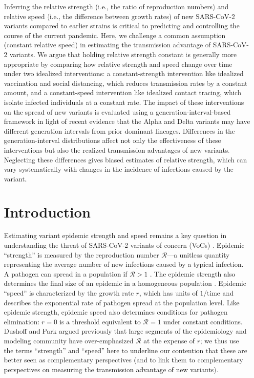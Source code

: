 \documentclass[12pt]{article}
\newcommand{\RR}{\ensuremath{{\mathcal R}}\xspace}
\begin{document}
Inferring the relative strength (i.e., the ratio of reproduction numbers) and relative speed (i.e., the difference between growth rates) of new SARS-CoV-2 variants compared to earlier strains is critical to predicting and controlling the course of the current pandemic.
Here, we challenge a common assumption (constant relative speed) in estimating the transmission advantage of SARS-CoV-2 variants.
We argue that holding relative strength constant is generally more appropriate by comparing how relative strength and speed change over time under two idealized interventions:
a constant-strength intervention like idealized vaccination and social distancing, which reduces transmission rates by a constant amount, and a constant-speed intervention like idealized contact tracing, which isolate infected individuals at a constant rate.
The impact of these interventions on the spread of new variants is evaluated using a generation-interval-based framework in light of recent evidence that the Alpha and Delta variants may have different generation intervals from prior dominant lineages.
Differences in the generation-interval distributions affect not only the effectiveness of these interventions but also the realized transmission advantages of new variants.
Neglecting these differences gives biased estimates of relative strength, which can vary systematically with changes in the incidence of infections caused by the variant.

\section{Introduction}

Estimating variant epidemic strength and speed remains a key question in understanding the threat of SARS-CoV-2 variants of concern (VoCs) \cite{switzerland2021variant,davies2021estimated,di2021impact,graham2021changes,leung2021early,volz2021transmission,zhao2021,campbell2021increased}.
Epidemic ``strength'' is measured by the reproduction number $\RR$---a unitless quantity representing the average number of new infections caused by a typical infection. 
A pathogen can spread in a population if $\RR>1$ \citep{diekmann1990definition}.
The epidemic strength also determines the final size of an epidemic in a homogeneous population \citep{anderson1991infectious}.
Epidemic ``speed'' is characterized by the growth rate $r$, which has units of $1/\mathrm{time}$ and describes the exponential rate of pathogen spread at the population level.
Like epidemic strength, epidemic speed also determines conditions for pathogen elimination: $r=0$ is a threshold equivalent to $\RR=1$ under constant conditions.
Dushoff and Park \citep{doi:10.1098/rspb.2020.1556} argued previously that large segments of the epidemiology and modeling community have over-emphasized $\RR$ at the expense of $r$; 
we thus use the terms ``strength'' and ``speed''  here to underline our contention that these are better seen as complementary perspectives (and to link them to complementary perspectives on measuring the transmission advantage of new variants).
\end{document}
